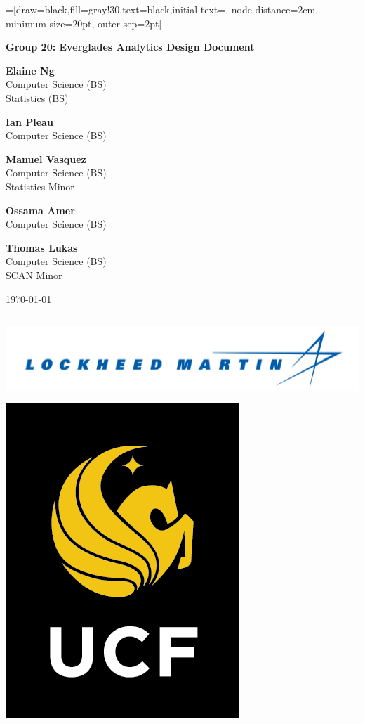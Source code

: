 \documentclass[a4paper,12pt]{report}
\newcommand{\authorname}[3]{
    \begin{minipage}[t]{.25\linewidth}
        \centering
        \textbf{#1} \\
        \small #2 \\
        #3
    \end{minipage}
}
\newenvironment{bottom}{\par\vspace*{\fill}}{\clearpage}
\begin{document}
=[draw=black,fill=gray!30,text=black,initial text=, node distance=2cm,
        minimum size=20pt, outer sep=2pt]

\begin{titlepage}
    \centering
    \Large\textbf{Group 20: Everglades Analytics Design Document}
    \normalsize
    \vspace*{.25in}
    
    
    \authorname{Elaine Ng}{Computer Science (BS)}{Statistics (BS)}
    \authorname{Ian Pleau}{Computer Science (BS)}{}
    \authorname{Manuel Vasquez}{Computer Science (BS)}{Statistics Minor}
    \vspace*{.125in}
    
    \authorname{Ossama Amer}{Computer Science (BS)}{}
    \authorname{Thomas Lukas}{Computer Science (BS)}{SCAN Minor}
    
    \vspace*{.25in}
    \today
    
    \vspace*{.4in}
    \noindent\rule{.5\linewidth}{.4pt}
    \vspace*{.4in}

        \begin{minipage}[c]{.35\linewidth}
            \centering
            \includegraphics[width=1\linewidth]{media/lm.png}
        \end{minipage}
        \begin{minipage}[c]{.3\linewidth}
            \centering
            \includegraphics[width=.2\linewidth]{media/ucf.png}
        \end{minipage}
\end{titlepage}
\end{document}
